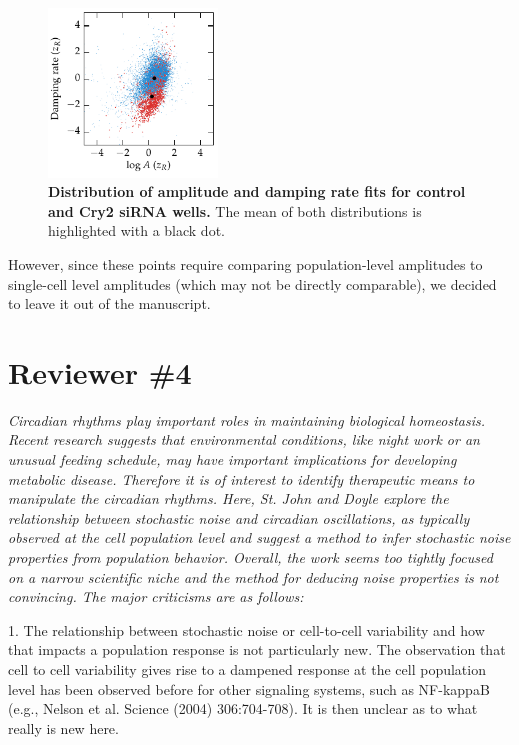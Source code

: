 \documentclass[11pt, letterpaper]{article}
\newenvironment{reviewer}{\itshape\color{gray}}{}
\begin{document}
\begin{figure}[h!]
  \begin{center}
    \includegraphics[width=0.4\textwidth]{response_figs/cry2_dist.pdf}
  \end{center}
  \caption{{\bfseries Distribution of amplitude and damping rate fits for control and Cry2 siRNA wells.} The mean of both distributions is highlighted with a black dot.}
\end{figure}

However, since these points require comparing population-level amplitudes to single-cell level amplitudes (which may not be directly comparable), we decided to leave it out of the manuscript.

\section*{Reviewer \#4}

\begin{reviewer}
Circadian rhythms play important roles in maintaining biological homeostasis. Recent research suggests that environmental conditions, like night work or an unusual feeding schedule, may have important implications for developing metabolic disease. Therefore it is of interest to identify therapeutic means to manipulate the circadian rhythms. Here, St. John and Doyle explore the relationship between stochastic noise and circadian oscillations, as typically observed at the cell population level and suggest a method to infer stochastic noise properties from population behavior. Overall, the work seems too tightly focused on a narrow scientific niche and the method for deducing noise properties is not convincing. The major criticisms are as follows:

1. The relationship between stochastic noise or cell-to-cell variability and how that impacts a population response is not particularly new. The observation that cell to cell variability gives rise to a dampened response at the cell population level has been observed before for other signaling systems, such as NF-kappaB (e.g., Nelson et al. Science (2004) 306:704-708). It is then unclear as to what really is new here.
\end{reviewer}
\end{document}
